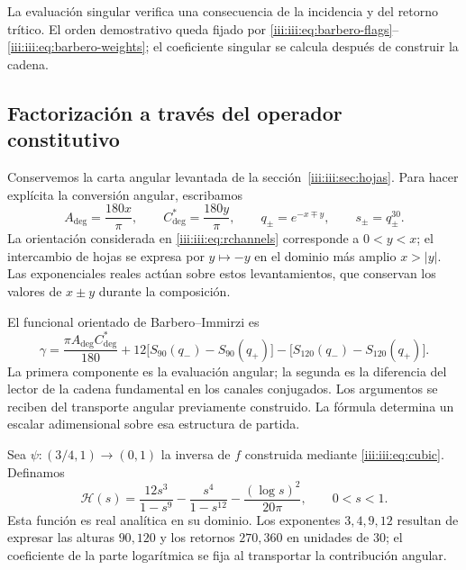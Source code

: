 La evaluación singular verifica una consecuencia de la incidencia y del
retorno trítico. El orden demostrativo queda fijado por
\eqref{iii:iii:eq:barbero-flags}--\eqref{iii:iii:eq:barbero-weights}; el
coeficiente singular se calcula después de construir la cadena.

\subsection{Factorización a través del operador constitutivo}

Conservemos la carta angular levantada de la
sección~\ref{iii:iii:sec:hojas}. Para hacer explícita la conversión angular,
escribamos
\begin{equation}
 A_{\deg}=\frac{180x}{\pi},\qquad
 C^*_{\deg}=\frac{180y}{\pi},\qquad
 q_\pm=e^{-x\mp y},\qquad s_\pm=q_\pm^{30}.
 \label{iii:iii:eq:barbero-angular-lift}
\end{equation}
La orientación considerada en \eqref{iii:iii:eq:rchannels} corresponde a
$0<y<x$; el intercambio de hojas se expresa por $y\mapsto-y$ en el
dominio más amplio $x>|y|$. Las exponenciales reales actúan sobre estos
levantamientos, que conservan los valores de $x\pm y$ durante la
composición.

El funcional orientado de Barbero--Immirzi es
\begin{equation}
 \gamma=\frac{\pi A_{\deg}C^*_{\deg}}{180}
   +12\bigl[S_{90}(q_-)-S_{90}(q_+)\bigr]
   -\bigl[S_{120}(q_-)-S_{120}(q_+)\bigr].
 \label{iii:iii:eq:barbero-functional}
\end{equation}
La primera componente es la evaluación angular; la segunda es la
diferencia del lector de la cadena fundamental en los canales conjugados.
Los argumentos se reciben del transporte angular previamente construido.
La fórmula determina un escalar adimensional sobre esa estructura de
partida.

Sea $\psi:(3/4,1)\to(0,1)$ la inversa de $f$ construida mediante
\eqref{iii:iii:eq:cubic}. Definamos
\begin{equation}
 \mathcal H(s)=\frac{12s^3}{1-s^9}
             -\frac{s^4}{1-s^{12}}
             -\frac{(\log s)^2}{20\pi},\qquad 0<s<1.
 \label{iii:iii:eq:barbero-h}
\end{equation}
Esta función es real analítica en su dominio. Los exponentes $3,4,9,12$
resultan de expresar las alturas $90,120$ y los retornos $270,360$ en
unidades de $30$; el coeficiente de la parte logarítmica se fija al
transportar la contribución angular.


